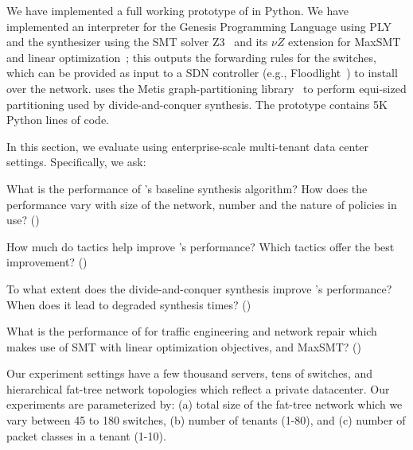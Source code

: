  We have implemented a full working
prototype of \Name in Python. We have implemented an interpreter for
the Genesis Programming Language using PLY~\cite{ply} and the synthesizer using 
the SMT solver Z3~\cite{z3} and its $\nu Z$ extension for MaxSMT and linear
 optimization~\cite{nuz3}; this outputs the
forwarding rules for the switches, which can be provided as input to a
SDN controller (e.g., Floodlight~\cite{floodlight}) to install over the
network. \Name uses the Metis graph-partitioning library~\cite{metis}
to perform equi-sized partitioning 
used by divide-and-conquer synthesis.  The prototype contains 5K Python lines of code.  

In this section, we evaluate \Name using
enterprise-scale multi-tenant data
center settings. 
Specifically, we ask:
\begin{compactitemize}

\item What is the performance of \Name's baseline synthesis
  algorithm? How does the performance vary with size of the
  network, number and the nature of policies in use? ()

\item How much do tactics help improve \Name's 
  performance? Which tactics offer the best improvement? ()

\item To what extent does the divide-and-conquer synthesis improve \Name's
  performance? When does it lead to degraded synthesis times? ()

\item What is the performance of \name for traffic engineering and network repair
which makes use of SMT with linear optimization objectives, and MaxSMT? ()

\end{compactitemize}
Our experiment settings have a few thousand servers, tens of switches,
and hierarchical fat-tree network topologies which reflect a private
datacenter. Our experiments are parameterized by: (a) total size of
the fat-tree network which we vary between 45 to 180 switches, (b) number of
tenants (1-80), and (c) number of packet classes in a tenant (1-10).

